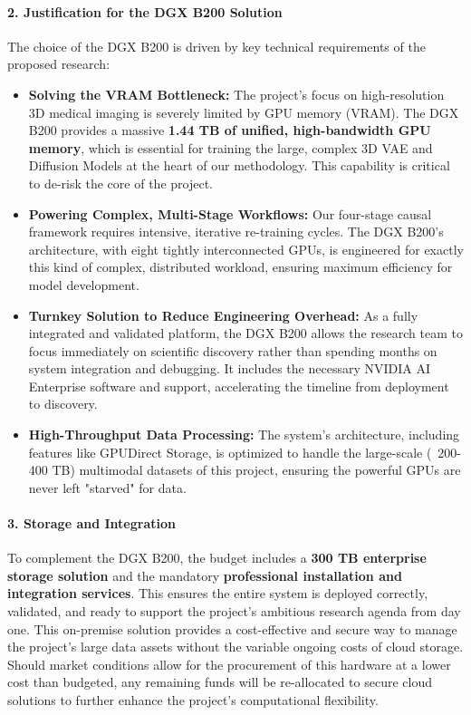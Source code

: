 \documentclass[11pt, a4paper]{article}
\begin{document}
\paragraph{2. Justification for the DGX B200 Solution}
The choice of the DGX B200 is driven by key technical requirements of the proposed research:
\begin{itemize}
    \item \textbf{Solving the VRAM Bottleneck:} The project's focus on high-resolution 3D medical imaging is severely limited by GPU memory (VRAM). The DGX B200 provides a massive \textbf{1.44 TB of unified, high-bandwidth GPU memory}, which is essential for training the large, complex 3D VAE and Diffusion Models at the heart of our methodology. This capability is critical to de-risk the core of the project.
    \item \textbf{Powering Complex, Multi-Stage Workflows:} Our four-stage causal framework requires intensive, iterative re-training cycles. The DGX B200's architecture, with eight tightly interconnected GPUs, is engineered for exactly this kind of complex, distributed workload, ensuring maximum efficiency for model development.
    \item \textbf{Turnkey Solution to Reduce Engineering Overhead:} As a fully integrated and validated platform, the DGX B200 allows the research team to focus immediately on scientific discovery rather than spending months on system integration and debugging. It includes the necessary NVIDIA AI Enterprise software and support, accelerating the timeline from deployment to discovery.
    \item \textbf{High-Throughput Data Processing:} The system's architecture, including features like GPUDirect Storage, is optimized to handle the large-scale (~200-400 TB) multimodal datasets of this project, ensuring the powerful GPUs are never left "starved" for data.
\end{itemize}

\paragraph{3. Storage and Integration}
To complement the DGX B200, the budget includes a \textbf{300 TB enterprise storage solution} and the mandatory \textbf{professional installation and integration services}. This ensures the entire system is deployed correctly, validated, and ready to support the project's ambitious research agenda from day one. This on-premise solution provides a cost-effective and secure way to manage the project's large data assets without the variable ongoing costs of cloud storage. Should market conditions allow for the procurement of this hardware at a lower cost than budgeted, any remaining funds will be re-allocated to secure cloud solutions to further enhance the project's computational flexibility.
\end{document}
